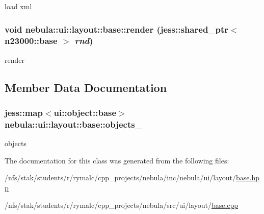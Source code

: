load xml \hypertarget{classnebula_1_1ui_1_1layout_1_1base_a43e2a38dd439038673ae39e31efca533}{
\subsubsection[{render}]{\setlength{\rightskip}{0pt plus 5cm}void nebula::ui::layout::base::render (jess::shared\_\-ptr$<$ {\bf n23000::base} $>$ {\em rnd})}}
\label{classnebula_1_1ui_1_1layout_1_1base_a43e2a38dd439038673ae39e31efca533}


render 

\subsection{Member Data Documentation}
\hypertarget{classnebula_1_1ui_1_1layout_1_1base_ab1251570bb5ba0d6725de30c77fc69eb}{
\subsubsection[{objects\_\-}]{\setlength{\rightskip}{0pt plus 5cm}jess::map$<${\bf ui::object::base}$>$ {\bf nebula::ui::layout::base::objects\_\-}}}
\label{classnebula_1_1ui_1_1layout_1_1base_ab1251570bb5ba0d6725de30c77fc69eb}


objects 

The documentation for this class was generated from the following files:\begin{DoxyCompactItemize}
\item 
/nfs/stak/students/r/rymalc/cpp\_\-projects/nebula/inc/nebula/ui/layout/\hyperlink{inc_2nebula_2ui_2layout_2base_8hpp}{base.hpp}\item 
/nfs/stak/students/r/rymalc/cpp\_\-projects/nebula/src/ui/layout/\hyperlink{src_2ui_2layout_2base_8cpp}{base.cpp}\end{DoxyCompactItemize}
